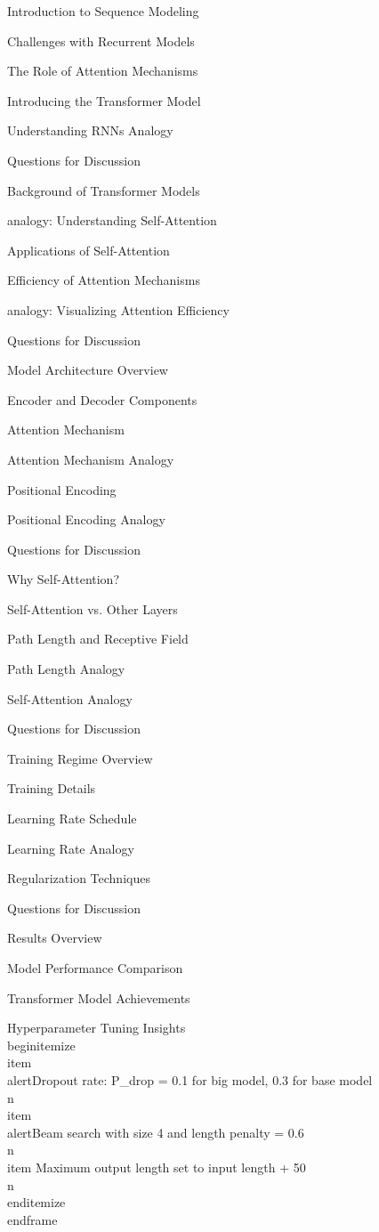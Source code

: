 \documentclass{beamer}
\begin{document}
\begin{frame}[]{Introduction to Sequence Modeling}
\begin{frame}[]{Challenges with Recurrent Models}
\begin{frame}[]{The Role of Attention Mechanisms}
\begin{frame}[]{Introducing the Transformer Model}
\begin{frame}[plain]{Understanding RNNs Analogy}
\begin{frame}[]{Questions for Discussion}
\begin{frame}[]{Background of Transformer Models}
\begin{frame}[plain]{analogy: Understanding Self-Attention}
\begin{frame}[]{Applications of Self-Attention}
\begin{frame}[]{Efficiency of Attention Mechanisms}
\begin{frame}[plain]{analogy: Visualizing Attention Efficiency}
\begin{frame}[]{Questions for Discussion}
\begin{frame}[]{Model Architecture Overview}
\begin{frame}[]{Encoder and Decoder Components}
\begin{frame}[]{Attention Mechanism}
\begin{frame}[plain]{Attention Mechanism Analogy}
\begin{frame}[]{Positional Encoding}
\begin{frame}[plain]{Positional Encoding Analogy}
\begin{frame}[]{Questions for Discussion}
\begin{frame}[]{Why Self-Attention?}
\begin{frame}[]{Self-Attention vs. Other Layers}
\begin{frame}[]{Path Length and Receptive Field}
\begin{frame}[plain]{Path Length Analogy}
\begin{frame}[plain]{Self-Attention Analogy}
\begin{frame}[]{Questions for Discussion}
\begin{frame}[]{Training Regime Overview}
\begin{frame}[]{Training Details}
\begin{frame}[]{Learning Rate Schedule}
\begin{frame}[plain]{Learning Rate Analogy}
\begin{frame}[]{Regularization Techniques}
\begin{frame}[]{Questions for Discussion}
\begin{frame}[]{Results Overview}
\begin{frame}[]{Model Performance Comparison}
\begin{frame}[]{Transformer Model Achievements}
\begingroup
{}\n{}\n\begin{frame}[]{Hyperparameter Tuning Insights}\n\\begin{itemize}
\\item \\alert{Dropout rate: P\_drop = 0.1 for big model, 0.3 for base model}\\n\\item \\alert{Beam search with size 4 and length penalty = 0.6}\\n\\item Maximum output length set to input length + 50\\n\\end{itemize}
\\end{frame}

\endgroup


\end{frame}
\end{frame}
\end{frame}
\end{frame}
\end{frame}
\end{frame}
\end{frame}
\end{frame}
\end{frame}
\end{frame}
\end{frame}
\end{frame}
\end{frame}
\end{frame}
\end{frame}
\end{frame}
\end{frame}
\end{frame}
\end{frame}
\end{frame}
\end{frame}
\end{frame}
\end{frame}
\end{frame}
\end{frame}
\end{frame}
\end{frame}
\end{frame}
\end{frame}
\end{frame}
\end{frame}
\end{frame}
\end{frame}
\end{frame}
\end{frame}
\end{document}
